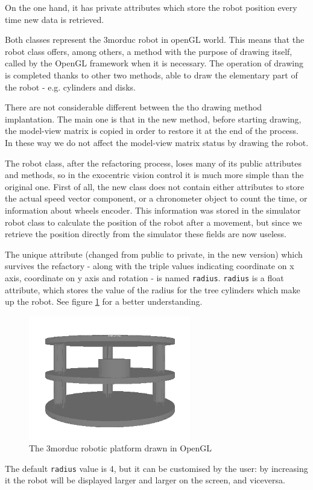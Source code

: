 On the one hand, it has private 
attributes which store the robot position every time 
new data is retrieved.
%

%

%
Both classes represent the 3morduc robot in openGL world. 
This means that the robot class offers, among others, a
method with the purpose of drawing itself, called by the 
OpenGL framework when it is necessary. The operation of 
drawing is completed thanks to other two methods, able 
to draw the elementary part of the robot - e.g. cylinders and disks.
%

%
There are not considerable different between the tho 
drawing method implantation. The main one is that in the 
new method, before starting drawing, the model-view matrix 
is copied in order to restore it at the end of the process. 
In these way we do not affect the model-view matrix status 
by drawing the robot.
%

%
The robot class, after the refactoring process, loses many 
of its public attributes and methods, so in the
exocentric vision control it is much more simple than the 
original one. First of all, the new class does not contain either
attributes to store the actual speed vector component, or 
a chronometer object to count the time, or information about wheels
encoder. This information was stored in the simulator robot 
class to calculate the position of the robot after a movement,
but since we retrieve the position directly from the simulator 
these fields are now useless. 
%

%
The unique attribute (changed from public to private, in 
the new version) which survives the refactory - along with the
triple values indicating coordinate on x axis, coordinate on 
y axis and rotation - is named \texttt{radius}. \texttt{radius}
is a float attribute, which stores the value of the radius for the 
tree cylinders which make up the robot. See figure
\ref{fig:3morduc_opengl} for a better understanding.
%
\begin{figure}[!h]
  \begin{center}
    \includegraphics[width=200pt]{img/3morduc_opengl.png}  %
    \caption{The 3morduc robotic platform drawn in OpenGL}
    \label{fig:3morduc_opengl}
  \end{center}
\end{figure}
%
The default \texttt{radius} value is 4, but it can be 
customised by the user: by increasing it the robot will be 
displayed larger and larger on the screen, and viceversa.
%


